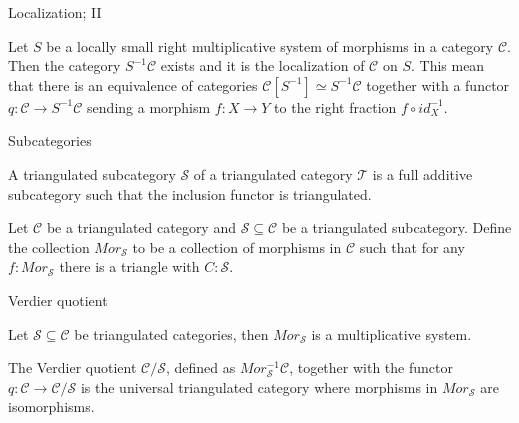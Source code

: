 \documentclass{beamer}
\begin{document}
            \begin{frame}{Localization; II}
                \begin{theorem}
                    Let $S$ be a locally small right multiplicative system of morphisms in a category $\mathcal{C}$. Then the category $S^{-1}\mathcal{C}$ exists and it is the localization of $\mathcal{C}$ on $S$. This mean that there is an equivalence of categories $\mathcal{C}[S^{-1}]\simeq S^{-1}\mathcal{C}$ together with a functor $q: \mathcal{C}\rightarrow S^{-1}\mathcal{C}$ sending a morphism $f : X\rightarrow Y$ to the right fraction $f\circ id_X^{-1}$.
                \end{theorem}
            \end{frame}

            \begin{frame}{Subcategories}
                \begin{definition}
                    A triangulated subcategory $\mathcal{S}$ of a triangulated category $\mathcal{T}$ is a full additive subcategory such that the inclusion functor is triangulated.
                \end{definition}

                \begin{definition}
                    Let $\mathcal{C}$ be a triangulated category and $\mathcal{S} \subseteq \mathcal{C}$ be a triangulated subcategory. Define the collection $Mor_{\mathcal{S}}$ to be a collection of morphisms in $\mathcal{C}$ such that for any $f : Mor_{\mathcal{S}}$ there is a triangle with $C : \mathcal{S}$.
                    \begin{center}
                    \end{center}
                \end{definition}
            \end{frame}


            \begin{frame}{Verdier quotient}
                \begin{lemma}
                    Let $\mathcal{S}\subseteq\mathcal{C}$ be triangulated categories, then $Mor_\mathcal{S}$ is a multiplicative system.
                \end{lemma}

                \begin{theorem}
                    The Verdier quotient $\mathcal{C}/\mathcal{S}$, defined as $Mor_\mathcal{S}^{-1}\mathcal{C}$, together with the functor $q:\mathcal{C}\rightarrow\mathcal{C}/\mathcal{S}$ is the universal triangulated category where morphisms in $Mor_\mathcal{S}$ are isomorphisms.
                \end{theorem}
            \end{frame}
\end{document}
